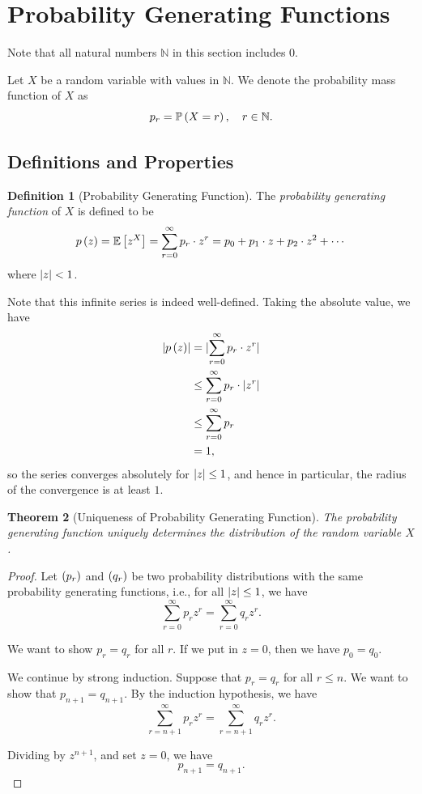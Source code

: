 \documentclass{article}
\newtheorem{theorem}{Theorem}[section]
\theoremstyle{definition}
\newtheorem{definition}[theorem]{Definition}
\theoremstyle{remark}
\DeclarePairedDelimiter{\abs}{\lvert}{\rvert}
\newcommand{\NN}{\mathbb{N}}
\newcommand{\Prob}{\mathbb{P}}
\newcommand{\Expt}{\mathbb{E}}
\begin{document}
\section{Probability Generating Functions}

Note that all natural numbers \(\NN\) in this section includes \(0\).

Let \(X\) be a random variable with values in \(\NN\). We denote the probability mass function of \(X\) as
\[
    p_r = \Prob\pqty{X = r}, \quad r \in \NN.
\]

\subsection{Definitions and Properties}

\begin{definition}[Probability Generating Function]
    \label{def:probability-generating-function}%
    The \emph{probability generating function} of \(X\) is defined to be
    \[
        p \pqty{z} = \Expt\bqty{z^X} = \sum_{r = 0}^{\infty} p_r \cdot z^r = p_0 + p_1 \cdot z + p_2 \cdot z^2 + \cdots
    \]
    where \(\abs{z} < 1\).
\end{definition}

Note that this infinite series is indeed well-defined. Taking the absolute value, we have
\begin{align*}
    \abs{p\pqty{z}} &= \abs{\sum_{r = 0}^{\infty} p_r \cdot z^r} \\
    &\leq \sum_{r = 0}^{\infty} p_r \cdot \abs{z^r} \\
    &\leq \sum_{r = 0}^{\infty} p_r \\
    &= 1,
\end{align*}
so the series converges absolutely for \(\abs{z} \leq 1\), and hence in particular, the radius of the convergence is at least \(1\).

\begin{theorem}[Uniqueness of Probability Generating Function]
    \label{thm:pgf-uniqueness}%
    The probability generating function uniquely determines the distribution of the random variable \(X\).
\end{theorem}

\begin{proof}
    Let \(\left(p_r\right)\) and \(\left(q_r\right)\) be two probability distributions with the same probability generating functions, i.e., for all \(\abs{z} \leq 1\), we have
    \[
        \sum_{r = 0}^{\infty} p_r z^r = \sum_{r = 0}^{\infty} q_r z^r.
    \]

    We want to show \(p_r = q_r\) for all \(r\). If we put in \(z = 0\), then we have \(p_0 = q_0\).

    We continue by strong induction. Suppose that \(p_r = q_r\) for all \(r \leq n\). We want to show that \(p_{n + 1} = q_{n + 1}\). By the induction hypothesis, we have
    \[
        \sum_{r = n + 1}^{\infty} p_r z^r = \sum_{r = n + 1}^{\infty} q_r z^r.
    \]

    Dividing by \(z^{n + 1}\), and set \(z = 0\), we have
    \[
        p_{n + 1} = q_{n + 1}.
    \]
\end{proof}
\end{document}
